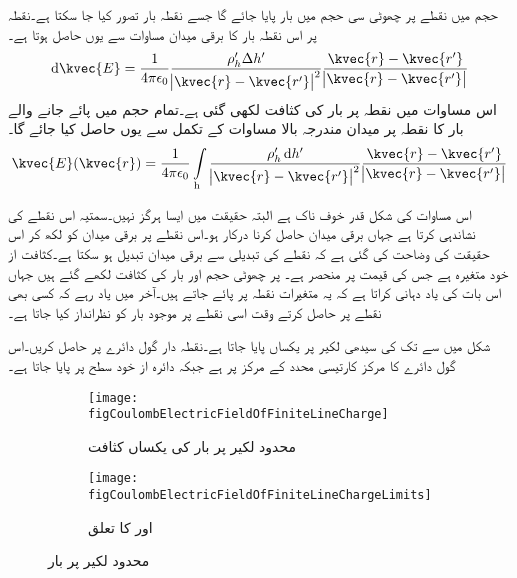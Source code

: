 حجم میں   نقطے پر چھوٹی سی حجم  میں  بار پایا جائے گا جسے نقطہ بار تصور کیا جا سکتا ہے۔نقطہ  پر اس نقطہ بار کا برقی میدان  مساوات  سے یوں حاصل ہوتا ہے۔
\begin{align*}
\dif \kvec{E}=\frac{1}{4 \pi \epsilon_0 }\frac{\rho_h' \Delta h'}{\abs{\kvec{r}-\kvec{r'}}^2} \frac{\kvec{r}-\kvec{r'}}{\abs{\kvec{r}-\kvec{r'}}}
\end{align*}
اس مساوات میں  نقطہ  پر بار کی کثافت  لکھی گئی ہے۔تمام حجم میں پائے جانے والے بار کا نقطہ  پر میدان مندرجہ بالا مساوات کے تکمل سے یوں حاصل کیا جائے گا۔
\begin{align}\label{مساوات_کولمب_حجم_بار_کا_میدان}
\kvec{E}(\kvec{r})=\frac{1}{4 \pi \epsilon_0 }\int\limits_{\textrm{h}}\frac{\rho_h'  \dif h'}{\abs{\kvec{r}-\kvec{r'}}^2} \frac{\kvec{r}-\kvec{r'}}{\abs{\kvec{r}-\kvec{r'}}}
\end{align}

اس مساوات کی  شکل قدر خوف ناک  ہے البتہ حقیقت میں ایسا ہرگز نہیں۔سمتیہ  اس نقطے کی نشاندہی کرتا ہے جہاں برقی میدان حاصل کرنا درکار ہو۔اس نقطے پر برقی میدان
 کو   لکھ کر اس حقیقت کی وضاحت کی گئی ہے کہ نقطے کی تبدیلی سے برقی میدان تبدیل ہو سکتا ہے۔کثافت از خود  متغیرہ ہے جس کی قیمت  پر منحصر ہے۔  پر چھوٹی حجم  اور بار کی کثافت  لکھے گئے ہیں جہاں  اس بات کی یاد دہانی کراتا ہے کہ یہ متغیرات نقطہ  پر پائے جاتے ہیں۔آخر میں یاد رہے کہ کسی بھی نقطے پر  حاصل کرتے وقت اسی نقطے پر موجود بار کو نظرانداز کیا جاتا ہے۔

شکل  میں  سے  تک کی سیدھی لکیر پر  یکساں  پایا جاتا ہے۔نقطہ دار گول دائرے پر  حاصل کریں۔اس گول دائرے کا مرکز  کارتیسی محدد کے مرکز  پر ہے جبکہ دائرہ از خود  سطح پر پایا جاتا ہے۔ 
\begin{figure}
\begin{subfigure}{0.5\textwidth}
\centering
\texttt{[image: figCoulombElectricFieldOfFiniteLineCharge]}
\caption{محدود لکیر پر بار کی یکساں کثافت}
\end{subfigure}
%
\begin{subfigure}{0.5\textwidth}
\centering
\texttt{[image: figCoulombElectricFieldOfFiniteLineChargeLimits]}
\caption{ اور  کا تعلق}
\end{subfigure}
\caption{محدود لکیر پر بار}
\label{شکل_کولمب_محدود_لکیر_پر_بار}
\end{figure}

